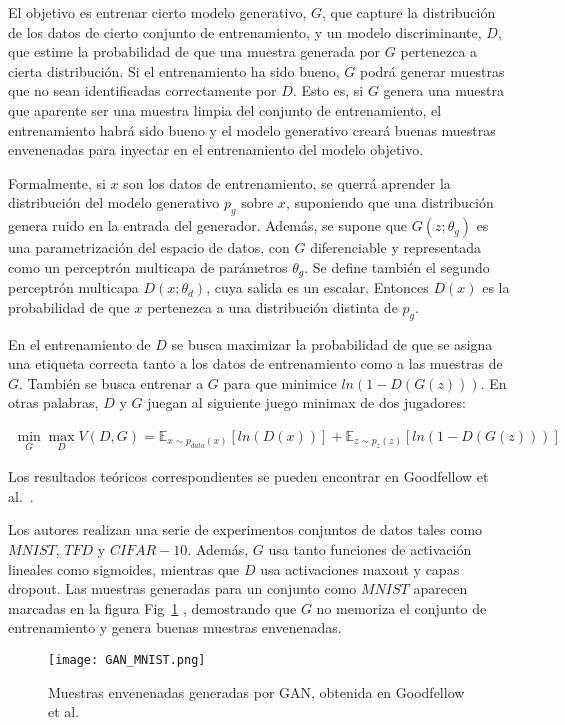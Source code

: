 El objetivo es entrenar cierto modelo generativo, $G$, que capture la distribución de los datos de cierto conjunto de entrenamiento, y un modelo discriminante, $D$, que estime la probabilidad de que una muestra generada por $G$ pertenezca a cierta distribución. Si el entrenamiento ha sido bueno, $G$ podrá generar muestras que no sean identificadas correctamente por $D$. Esto es, si $G$ genera una muestra que aparente ser una muestra limpia del conjunto de entrenamiento, el entrenamiento habrá sido bueno y el modelo generativo creará buenas muestras envenenadas para inyectar en el entrenamiento del modelo objetivo.

Formalmente, si $x$ son los datos de entrenamiento, se querrá aprender la distribución del modelo generativo $p_g$ sobre $x$, suponiendo que una distribución genera ruido en la entrada del generador. Además, se supone que $G(z;\theta_g)$ es una parametrización del espacio de datos, con $G$ diferenciable y representada como un perceptrón multicapa de parámetros $\theta_g$. Se define también el segundo perceptrón multicapa $D(x;\theta_d)$, cuya salida es un escalar. Entonces $D(x)$ es la probabilidad de que $x$ pertenezca a una distribución distinta de $p_g$.

En el entrenamiento de $D$ se busca maximizar la probabilidad de que se asigna una etiqueta correcta tanto a los datos de entrenamiento como a las muestras de $G$. También se busca entrenar a $G$ para que minimice $ln(1-D(G(z)))$. En otras palabras, $D$ y $G$ juegan al siguiente juego minimax de dos jugadores:

\begin{align}
\min_G \max_D V(D,G) = \mathbb{E}_{x \sim p_{data}(x)} \left[ ln(D(x)) \right] + \mathbb{E}_{z \sim p_z(z)} \left[ ln(1-D(G(z))) \right]
\end{align}

Los resultados teóricos correspondientes se pueden encontrar en Goodfellow et al.~\cite{GAN}.

Los autores realizan una serie de experimentos conjuntos de datos tales como $MNIST$, $TFD$ y $CIFAR-10$. Además, $G$ usa tanto funciones de activación lineales como sigmoides, mientras que $D$ usa activaciones maxout y capas dropout. Las muestras generadas para un conjunto como $MNIST$ aparecen marcadas en la figura Fig~\ref{fig:GAN_MNIST} , demostrando que $G$ no memoriza el conjunto de entrenamiento y genera buenas muestras envenenadas.

\begin{figure}[h]
    \centering
    \texttt{[image: GAN\_MNIST.png]}
    \caption{Muestras envenenadas generadas por GAN, obtenida en Goodfellow et al.~\cite{GAN}}
    \label{fig:GAN_MNIST}
\end{figure}

